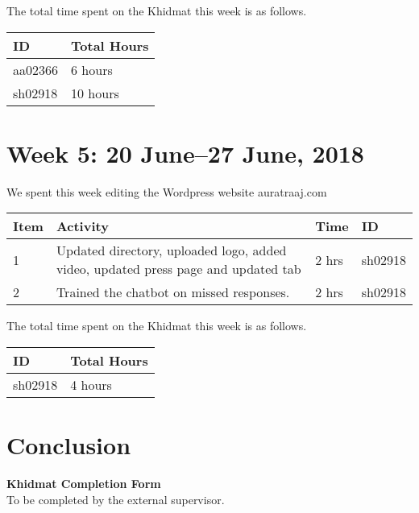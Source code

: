 ﻿\documentclass{article}
\begin{document}
The total time spent on the Khidmat this week is as follows.

\begin{tabular}{|l|l|}
  \hline
  ID & Total Hours\\\hline\hline
  aa02366 & 6 hours\\\hline
  sh02918 & 10 hours\\\hline
\end{tabular}

\newpage %
\section*{Week 5: 20 June--27 June, 2018}

We spent this week editing the Wordpress website auratraaj.com

\begin{tabular}{|l|l|l|l|}
  \hline
  Item 	& Activity & Time & ID \\\hline\hline
  1	& Updated directory, uploaded logo, added video, updated press page and updated tab & 2 hrs & sh02918 \\\hline
  2	& Trained the chatbot on missed responses. & 2 hrs & sh02918\\\hline

\end{tabular}

The total time spent on the Khidmat this week is as follows.

\begin{tabular}{|l|l|}
  \hline
  ID & Total Hours\\\hline\hline
  sh02918 & 4 hours\\\hline
\end{tabular}

\newpage
\section*{Conclusion}


\newpage
\thispagestyle{empty}

\begin{center}
  {\Large\bf Khidmat Completion Form}\\[5pt]
  \small To be completed by the external supervisor.  
\end{center}
\bigskip
\end{document}
